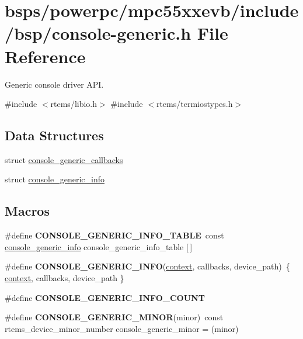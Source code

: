 \hypertarget{console-generic_8h}{}\section{bsps/powerpc/mpc55xxevb/include/bsp/console-\/generic.h File Reference}
\label{console-generic_8h}


Generic console driver A\+PI.  


{\ttfamily \#include $<$rtems/libio.\+h$>$}\newline
{\ttfamily \#include $<$rtems/termiostypes.\+h$>$}\newline
\subsection*{Data Structures}
\begin{DoxyCompactItemize}
\item 
struct \mbox{\hyperlink{structconsole__generic__callbacks}{console\+\_\+generic\+\_\+callbacks}}
\item 
struct \mbox{\hyperlink{structconsole__generic__info}{console\+\_\+generic\+\_\+info}}
\end{DoxyCompactItemize}
\subsection*{Macros}
\begin{DoxyCompactItemize}
\item 
\mbox{\label{console-generic_8h_ab52ec597a0af3a1912807a638b19352e}} 
\#define {\bfseries C\+O\+N\+S\+O\+L\+E\+\_\+\+G\+E\+N\+E\+R\+I\+C\+\_\+\+I\+N\+F\+O\+\_\+\+T\+A\+B\+LE}~const \mbox{\hyperlink{structconsole__generic__info}{console\+\_\+generic\+\_\+info}} console\+\_\+generic\+\_\+info\+\_\+table \mbox{[}$\,$\mbox{]}
\item 
\mbox{\label{console-generic_8h_a41a375fce7c14f8b86e287c6bd6db13b}} 
\#define {\bfseries C\+O\+N\+S\+O\+L\+E\+\_\+\+G\+E\+N\+E\+R\+I\+C\+\_\+\+I\+N\+FO}(\mbox{\hyperlink{sun4u_2tte_8h_a9b4a99475e2709333b8e5d70483173f1}{context}},  callbacks,  device\+\_\+path)~\{ \mbox{\hyperlink{sun4u_2tte_8h_a9b4a99475e2709333b8e5d70483173f1}{context}}, callbacks, device\+\_\+path \}
\item 
\#define {\bfseries C\+O\+N\+S\+O\+L\+E\+\_\+\+G\+E\+N\+E\+R\+I\+C\+\_\+\+I\+N\+F\+O\+\_\+\+C\+O\+U\+NT}
\item 
\mbox{\label{console-generic_8h_ac11a9ba6f3b640e41b534ffea8e7a0a9}} 
\#define {\bfseries C\+O\+N\+S\+O\+L\+E\+\_\+\+G\+E\+N\+E\+R\+I\+C\+\_\+\+M\+I\+N\+OR}(minor)~const rtems\+\_\+device\+\_\+minor\+\_\+number console\+\_\+generic\+\_\+minor = (minor)
\end{DoxyCompactItemize}
